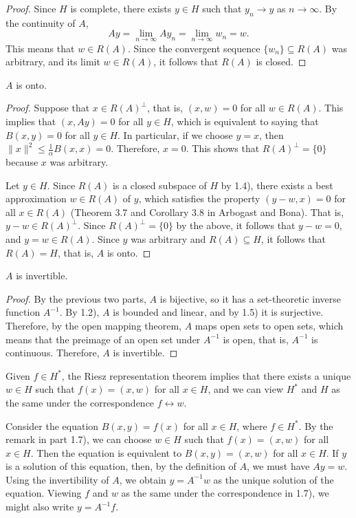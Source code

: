 \documentclass{homework}
\begin{document}
\begin{arabicparts}
\begin{proof}
			Since $H$ is complete, there exists $y \in H$ such that $y_n \to y$ as $n \to \infty$. By the continuity of $A$,
			\begin{equation}
				Ay = \lim_{n\to \infty}Ay_n = \lim_{n\to\infty} w_n = w.
			\end{equation}
			This means that $w \in R(A)$. Since the convergent sequence $\{w_n\}\subseteq R(A)$ was arbitrary, and its limit $w \in R(A)$, it follows that $R(A)$ is closed.
		\end{proof}
		
		\questionpart
		$A$ is onto.
		\begin{proof}
			Suppose that $x \in R(A)^\perp$, that is, $(x, w) = 0$ for all $w \in R(A)$. This implies that $(x, Ay) = 0$ for all $y \in H$, which is equivalent to saying that $B(x, y) = 0$ for all $y \in H$. In particular, if we choose $y = x$, then $\lVert x\rVert^2 \le \frac{1}{\alpha}B(x, x) = 0$. Therefore, $x = 0$. This shows that $R(A)^\perp = \{0\}$ because $x$ was arbitrary. 
			
			Let $y \in H$. Since $R(A)$ is a closed subspace of $H$ by 1.4), there exists a best approximation $w \in R(A)$ of $y$, which satisfies the property $(y - w, x) = 0$ for all $x \in R(A)$ (Theorem 3.7 and Corollary 3.8 in Arbogast and Bona). That is, $y-w \in R(A)^\perp$. Since $R(A)^\perp =\{0\}$ by the above, it follows that $y-w = 0$, and $y=w \in R(A)$. Since $y$ was arbitrary and $R(A) \subseteq H$, it follows that $R(A) = H$, that is, $A$  is onto.
		\end{proof}
		
		\questionpart
		$A$ is invertible.
		\begin{proof}
			By the previous two parts, $A$ is bijective, so it has a set-theoretic inverse function $A^{-1}$. By 1.2), $A$ is bounded and linear, and by 1.5) it is surjective. Therefore, by the open mapping theorem, $A$ maps open sets to open sets, which means that the preimage of an open set under $A^{-1}$ is open, that is, $A^{-1}$ is continuous. Therefore, $A$ is invertible.
		\end{proof}
		
		\questionpart
		Given $f \in H^{*}$, the Riesz representation theorem implies that there exists a unique $w \in H$ such that $f(x) = (x,w)$ for all $x \in H$, and we can view $H^{*}$ and $H$ as the same under the correspondence $f \leftrightarrow w$.
		
		\questionpart
		Consider the equation $B(x,y) = f(x)$ for all $x \in H$, where $f \in H^{*}$. By the remark in part 1.7), we can choose $w \in H$ such that $f(x) = (x,w)$ for all $x \in H$. Then the equation is equivalent to $B(x,y) = (x,w)$ for all $x \in H$. If $y$ is a solution of this equation, then, by the definition of $A$, we must have $Ay = w$. Using the invertibility of $A$, we obtain $y = A^{-1}w$ as the unique solution of the equation. Viewing $f$ and $w$ as the same under the correspondence in 1.7), we might also write $y = A^{-1}f$.
	\end{arabicparts}
	
\end{document}
